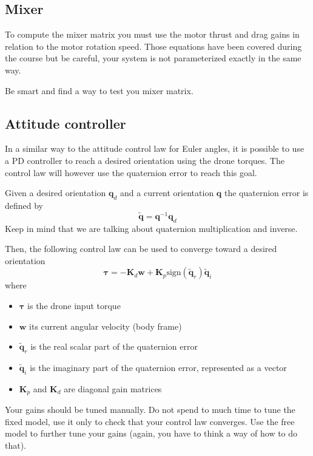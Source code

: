 \documentclass[a4paper]{article}
\begin{document}
\subsection{Mixer}
To compute the mixer matrix you must use the motor thrust and drag gains in relation to the motor rotation speed. Those equations have been covered during the course but be careful, your system is not parameterized exactly in the same way.

Be smart and find a way to test you mixer matrix.

\subsection{Attitude controller}
In a similar way to the attitude control law for Euler angles, it is possible to use a PD controller to reach a desired orientation using the drone torques. The control law will however use the quaternion error to reach this goal.

Given a desired orientation $\mathbf{q}_d$ and a current orientation $\mathbf{q}$ the quaternion error is defined by
\begin{equation*}
	\tilde{\mathbf{q}} = \mathbf{q}^{-1}\mathbf{q}_d
\end{equation*}
Keep in mind that we are talking about quaternion multiplication and inverse. 

Then, the following control law can be used to converge toward a desired orientation
\begin{equation*}
	\mathbf{\tau} = -\mathbf{K}_d\mathbf{w} + \mathbf{K}_p\text{sign}(\tilde{\mathbf{q}}_{r})\tilde{\mathbf{q}}_{i}
\end{equation*}
where 
\begin{itemize}
	\item $\mathbf{\tau}$ is the drone input torque
	\item $\mathbf{w}$ its current angular velocity (body frame)
	\item $\tilde{\mathbf{q}}_{r}$ is the real scalar part of the quaternion error
	\item $\tilde{\mathbf{q}}_{i}$ is the imaginary part of the quaternion error, represented as a vector
	\item $\mathbf{K}_p$ and $\mathbf{K}_d$ are diagonal gain matrices
\end{itemize}

Your gains should be tuned manually. Do not spend to much time to tune the fixed model, use it only to check that your control law converges. Use the free model to further tune your gains (again, you have to think a way of how to do that).
\end{document}

